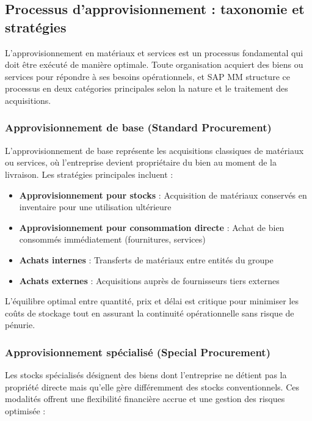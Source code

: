 \documentclass[12pt,a4paper,oneside]{report}
\begin{document}
\subsection{Processus d'approvisionnement : taxonomie et stratégies}\label{ch2:mm-approv-process}

L'approvisionnement en matériaux et services est un processus fondamental qui doit être exécuté de manière optimale. 
Toute organisation acquiert des biens ou services pour répondre à ses besoins opérationnels, et SAP MM structure ce processus 
en deux catégories principales selon la nature et le traitement des acquisitions.

\subsubsection{Approvisionnement de base (Standard Procurement)}\label{ch2:mm-approv-base}

L'approvisionnement de base représente les acquisitions classiques de matériaux ou services, où l'entreprise devient propriétaire 
du bien au moment de la livraison. Les stratégies principales incluent :

\begin{itemize}[label=---, itemsep=0.15em]
	\item \textbf{Approvisionnement pour stocks} : Acquisition de matériaux conservés en inventaire pour une utilisation ultérieure
	\item \textbf{Approvisionnement pour consommation directe} : Achat de bien consommés immédiatement (fournitures, services)
	\item \textbf{Achats internes} : Transferts de matériaux entre entités du groupe
	\item \textbf{Achats externes} : Acquisitions auprès de fournisseurs tiers externes
\end{itemize}

L'équilibre optimal entre quantité, prix et délai est critique pour minimiser les coûts de stockage tout en assurant 
la continuité opérationnelle sans risque de pénurie.

\subsubsection{Approvisionnement spécialisé (Special Procurement)}\label{ch2:mm-approv-special}

Les stocks spécialisés désignent des biens dont l'entreprise ne détient pas la propriété directe mais qu'elle gère 
différemment des stocks conventionnels. Ces modalités offrent une flexibilité financière accrue et une gestion des risques optimisée :
\end{document}
